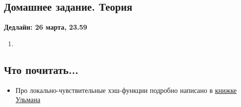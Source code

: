 \subsection{Домашнее задание. Теория}
\textbf{Дедлайн: 26 марта, 23.59}

\begin{enumerate}

  \item 
\end{enumerate}

\subsection{Что почитать...}

\begin{itemize}

\item Про локально-чувствительные хэш-функции подробно написано в \href{http://infolab.stanford.edu/~ullman/mmds/book.pdf}{книжке Ульмана}
  
\end{itemize}


\clearpage
